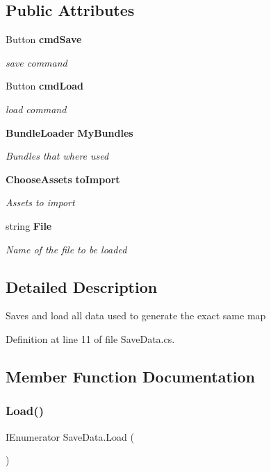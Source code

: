 \subsection*{Public Attributes}
\begin{DoxyCompactItemize}
\item 
Button \textbf{ cmd\+Save}
\begin{DoxyCompactList}\small\item\em save command \end{DoxyCompactList}\item 
Button \textbf{ cmd\+Load}
\begin{DoxyCompactList}\small\item\em load command \end{DoxyCompactList}\item 
\textbf{ Bundle\+Loader} \textbf{ My\+Bundles}
\begin{DoxyCompactList}\small\item\em Bundles that where used \end{DoxyCompactList}\item 
\textbf{ Choose\+Assets} \textbf{ to\+Import}
\begin{DoxyCompactList}\small\item\em Assets to import \end{DoxyCompactList}\item 
string \textbf{ File}
\begin{DoxyCompactList}\small\item\em Name of the file to be loaded \end{DoxyCompactList}\end{DoxyCompactItemize}


\subsection{Detailed Description}
Saves and load all data used to generate the exact same map 



Definition at line 11 of file Save\+Data.\+cs.



\subsection{Member Function Documentation}
\mbox{\label{class_save_data_ada9439f7605b4a2e4c6f2ae19467e056}} 
\subsubsection{Load()}
{\footnotesize\ttfamily I\+Enumerator Save\+Data.\+Load (\begin{DoxyParamCaption}{ }\end{DoxyParamCaption})}



